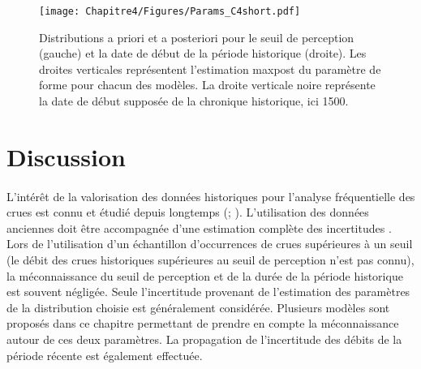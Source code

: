 	\begin{figure}[h]
		\centering
		\texttt{[image: Chapitre4/Figures/Params\_C4short.pdf]}	
		\caption{Distributions a priori et a posteriori pour le seuil de perception (gauche) et la date de début de la période historique (droite). Les droites verticales représentent l'estimation maxpost du paramètre de forme pour chacun des modèles. La droite verticale noire représente la date de début supposée de la chronique historique, ici 1500.}
		\label{fig:Params_C4short}
	\end{figure}
	
	\FloatBarrier
	
	\section{Discussion}
	\label{sec:Discussion}
	\paragraph{} L'intérêt de la valorisation des données historiques pour l'analyse fréquentielle des crues est connu et étudié depuis longtemps (\cite{benson_use_1950}; \cite{stedinger_flood_1986}). L'utilisation des données anciennes doit être accompagnée d'une estimation complète des incertitudes \citep{kjeldsen_documentary_2014}. Lors de l'utilisation d'un échantillon d'occurrences de crues supérieures à un seuil (le débit des crues historiques supérieures au seuil de perception n'est pas connu), la méconnaissance du seuil de perception et de la durée de la période historique est souvent négligée. Seule l'incertitude provenant de l'estimation des paramètres de la distribution choisie est généralement considérée. Plusieurs modèles sont proposés dans ce chapitre permettant de prendre en compte la méconnaissance autour de ces deux paramètres. La propagation de l'incertitude des débits de la période récente est également effectuée. 
	
